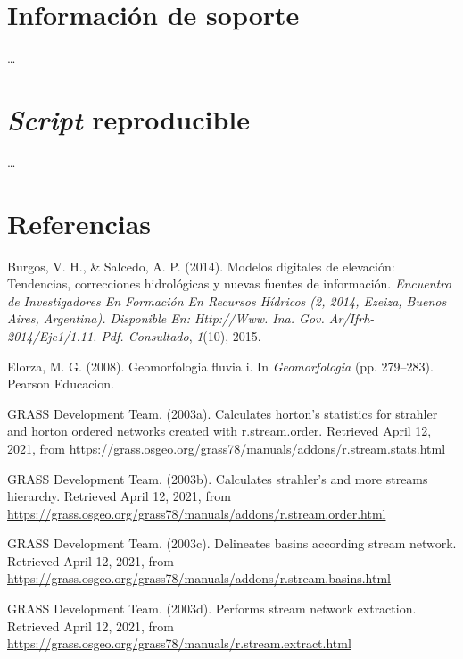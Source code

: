 \documentclass[11pt,]{article}
\begin{document}
\section{Información de soporte}\label{informaciuxf3n-de-soporte}

\ldots

\section{\texorpdfstring{\emph{Script}
reproducible}{Script reproducible}}\label{script-reproducible}

\ldots

\section*{Referencias}\label{referencias}

\hypertarget{refs}{}
\hypertarget{ref-burgos2014modelos}{}
Burgos, V. H., \& Salcedo, A. P. (2014). Modelos digitales de elevación:
Tendencias, correcciones hidrológicas y nuevas fuentes de información.
\emph{Encuentro de Investigadores En Formación En Recursos Hídricos (2,
2014, Ezeiza, Buenos Aires, Argentina). Disponible En: Http://Www. Ina.
Gov. Ar/Ifrh-2014/Eje1/1.11. Pdf. Consultado}, \emph{1}(10), 2015.

\hypertarget{ref-GutierrezElorza}{}
Elorza, M. G. (2008). Geomorfologia fluvia i. In \emph{Geomorfologia}
(pp. 279--283). Pearson Educacion.

\hypertarget{ref-addonrstreamstats}{}
GRASS Development Team. (2003a). Calculates horton's statistics for
strahler and horton ordered networks created with r.stream.order.
Retrieved April 12, 2021, from
\url{https://grass.osgeo.org/grass78/manuals/addons/r.stream.stats.html}

\hypertarget{ref-addonrstreamorder}{}
GRASS Development Team. (2003b). Calculates strahler's and more streams
hierarchy. Retrieved April 12, 2021, from
\url{https://grass.osgeo.org/grass78/manuals/addons/r.stream.order.html}

\hypertarget{ref-addonrstreambasins}{}
GRASS Development Team. (2003c). Delineates basins according stream
network. Retrieved April 12, 2021, from
\url{https://grass.osgeo.org/grass78/manuals/addons/r.stream.basins.html}

\hypertarget{ref-addonrstreamextract}{}
GRASS Development Team. (2003d). Performs stream network extraction.
Retrieved April 12, 2021, from
\url{https://grass.osgeo.org/grass78/manuals/r.stream.extract.html}
\end{document}
